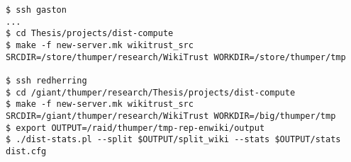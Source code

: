 \begin{verbatim}
$ ssh gaston
...
$ cd Thesis/projects/dist-compute
$ make -f new-server.mk wikitrust_src SRCDIR=/store/thumper/research/WikiTrust WORKDIR=/store/thumper/tmp

$ ssh redherring
$ cd /giant/thumper/research/Thesis/projects/dist-compute
$ make -f new-server.mk wikitrust_src SRCDIR=/giant/thumper/research/WikiTrust WORKDIR=/big/thumper/tmp
$ export OUTPUT=/raid/thumper/tmp-rep-enwiki/output
$ ./dist-stats.pl --split $OUTPUT/split_wiki --stats $OUTPUT/stats dist.cfg
\end{verbatim}

